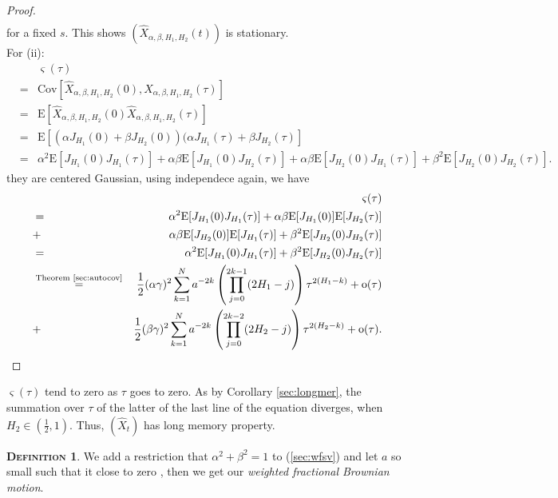 \documentclass[a4paper, twoside, 11pt]{article}
\theoremstyle{definition}
\newtheorem{definition}{\scshape Definition}[section]
\newcommand{\brkt}[1]{\left({#1} \right)}
\begin{document}
\begin{proof}
\begin{eqnarray*}
  \end{eqnarray*}
  for a fixed $s$. This shows $(\hat{X}_{\alpha,\beta,H_1,H_2}(t))$ is stationary.\\
  For (ii): 
  \begin{eqnarray*}
	&&\varsigma(\tau) \\
	&=& \mathrm{Cov}[\hat{X}_{\alpha,\beta,H_1,H_2}(0), \hat{X}_{\alpha,\beta,H_1,H_2}(\tau)]\\
	&=& \mathrm{E}[\hat{X}_{\alpha,\beta,H_1,H_2}(0) \hat{X}_{\alpha,\beta,H_1,H_2}(\tau)]\\
	&=& \mathrm{E}[(\alpha J_{H_1}(0) + \beta J_{H_2}(0))(\alpha J_{H_1}(\tau) + \beta J_{H_2}(\tau)]\\
	&=& \alpha^2\mathrm{E}[J_{H_1}(0) J_{H_1}(\tau)] + \alpha\beta\mathrm{E}[J_{H_1}(0)J_{H_2}(\tau)] + \alpha\beta\mathrm{E}[J_{H_2}(0)J_{H_1}(\tau)] + \beta^2\mathrm{E}[J_{H_2}(0)J_{H_2}(\tau)].
  \end{eqnarray*}
   they are centered Gaussian, using independece again, we have
  \begin{eqnarray*}
	&&\varsigma(\tau) \\
	&=& \alpha^2\mathrm{E}[J_{H_1}(0) J_{H_1}(\tau)] + \alpha\beta\mathrm{E}[J_{H_1}(0)]\mathrm{E}[J_{H_2}(\tau)] \\
	&+& \alpha\beta\mathrm{E}[J_{H_2}(0)]\mathrm{E}[J_{H_1}(\tau)] + \beta^2\mathrm{E}[J_{H_2}(0)J_{H_2}(\tau)]\\
	&=& \alpha^2\mathrm{E}[J_{H_1}(0) J_{H_1}(\tau)] + \beta^2\mathrm{E}[J_{H_2}(0)J_{H_2}(\tau)]\\
  &\overset{\text{Theorem \ref{sec:autocov}}}{=}& \frac{1}{2} (\alpha\gamma)^2 \sum_{k=1}^{N} a^{-2k}\brkt{\prod_{j=0}^{2k-1}(2H_1-j)}\tau^{2(H_1-k)} + \mathrm{o}(\tau)\\
  &+& \frac{1}{2} (\beta\gamma)^2 \sum_{k=1}^{N} a^{-2k}\brkt{\prod_{j=0}^{2k-2}(2H_2-j)}\tau^{2(H_2-k)} + \mathrm{o}(\tau).
  \end{eqnarray*}
  \end{proof}
  $\varsigma(\tau)$ tend to zero as $\tau$ goes to zero. As by Corollary \ref{sec:longmer}, the summation over $\tau$ of the latter of the last line of the equation diverges, when $H_2 \in (\frac{1}{2}, 1)$. Thus, $(\hat{X}_t)$ has long memory property. 

  \begin{definition}
	We add a restriction that $\alpha^2 + \beta^2 = 1$ to (\ref{sec:wfsv}) and let $a$ so small such that it close to zero , then we get our \emph{weighted fractional Brownian motion}.
  \end{definition}
  
\end{document}
